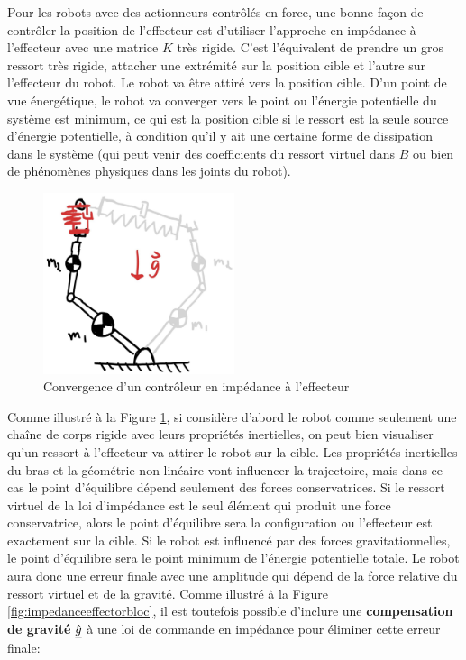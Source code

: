 Pour les robots avec des actionneurs contrôlés en force, une bonne façon de contrôler la position de l'effecteur est d'utiliser l'approche en impédance à l'effecteur avec une matrice $K$ très rigide. C'est l'équivalent de prendre un gros ressort très rigide, attacher une extrémité sur la position cible et l'autre sur l'effecteur du robot. Le robot va être attiré vers la position cible. D'un point de vue énergétique, le robot va converger vers le point ou l'énergie potentielle du système est minimum, ce qui est la position cible si le ressort est la seule source d'énergie potentielle, à condition qu'il y ait une certaine forme de dissipation dans le système (qui peut venir des coefficients du ressort virtuel dans $B$ ou bien de phénomènes physiques dans les joints du robot).
\begin{figure}[h]
	\centering
	\includegraphics[width=0.5\textwidth]{fig/impedancecontroltaskconvergencegeo.jpg}
	\caption{Convergence d'un contrôleur en impédance à l'effecteur}
	\label{fig:impedancecontroltaskconvergencegeo}
\end{figure}
%
Comme illustré à la Figure \ref{fig:impedancecontroltaskconvergencegeo}, si considère d'abord le robot comme seulement une chaîne de corps rigide avec leurs propriétés inertielles, on peut bien visualiser qu'un ressort à l'effecteur va attirer le robot sur la cible. Les propriétés inertielles du bras et la géométrie non linéaire vont influencer la trajectoire, mais dans ce cas le point d'équilibre dépend seulement des forces conservatrices. Si le ressort virtuel de la loi d'impédance est le seul élément qui produit une force conservatrice, alors le point d'équilibre sera la configuration ou l'effecteur est exactement sur la cible. Si le robot est influencé par des forces gravitationnelles, le point d'équilibre sera le point minimum de l'énergie potentielle totale. Le robot aura donc une erreur finale avec une amplitude qui dépend de la force relative du ressort virtuel et de la gravité. Comme illustré à la Figure \ref{fig:impedanceeffectorbloc}, il est toutefois possible d'inclure une \textbf{compensation de gravité} $\underline{\hat{g}}$ à une loi de commande en impédance pour éliminer cette erreur finale:

